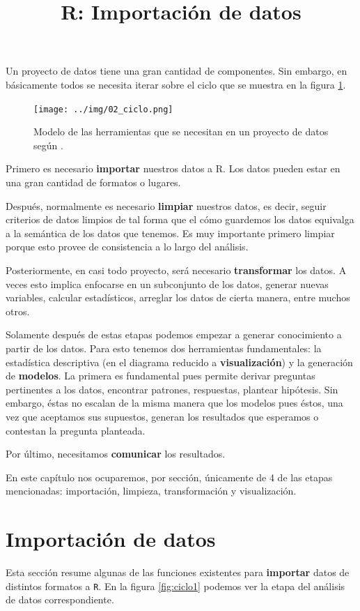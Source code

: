 \documentclass[]{article}
\title{R: Importación de datos}
\author{}
\date{}
\begin{document}
Un proyecto de datos tiene una gran cantidad de componentes. Sin
embargo, en básicamente todos se necesita iterar sobre el ciclo que se
muestra en la figura \ref{fig:ciclo}.

\begin{figure}[h]
    \centering
    \texttt{[image: ../img/02\_ciclo.png]}
    \caption{Modelo de las herramientas que se necesitan en un proyecto de datos según \textcite[Introducción]{grolemund2016r}.}
    \label{fig:ciclo}
\end{figure}

Primero es necesario \textbf{importar} nuestros datos a R. Los datos
pueden estar en una gran cantidad de formatos o lugares.

Después, normalmente es necesario \textbf{limpiar} nuestros datos, es
decir, seguir criterios de datos limpios de tal forma que el cómo
guardemos los datos equivalga a la semántica de los datos que tenemos.
Es muy importante primero limpiar porque esto provee de consistencia a
lo largo del análisis.

Posteriormente, en casi todo proyecto, será necesario
\textbf{transformar} los datos. A veces esto implica enfocarse en un
subconjunto de los datos, generar nuevas variables, calcular
estadísticos, arreglar los datos de cierta manera, entre muchos otros.

Solamente después de estas etapas podemos empezar a generar conocimiento
a partir de los datos. Para esto tenemos dos herramientas fundamentales:
la estadística descriptiva (en el diagrama reducido a
\textbf{visualización}) y la generación de \textbf{modelos}. La primera
es fundamental pues permite derivar preguntas pertinentes a los datos,
encontrar patrones, respuestas, plantear hipótesis. Sin embargo, éstas
no escalan de la misma manera que los modelos pues éstos, una vez que
aceptamos sus supuestos, generan los resultados que esperamos o
contestan la pregunta planteada.

Por último, necesitamos \textbf{comunicar} los resultados.

En este capítulo nos ocuparemos, por sección, únicamente de 4 de las
etapas mencionadas: importación, limpieza, transformación y
visualización.

\section{Importación de datos}\label{importacion-de-datos}

Esta sección resume algunas de las funciones existentes para
\textbf{importar} datos de distintos formatos a \texttt{R}. En la figura
\ref{fig:ciclo1} podemos ver la etapa del análisis de datos
correspondiente.
\end{document}
